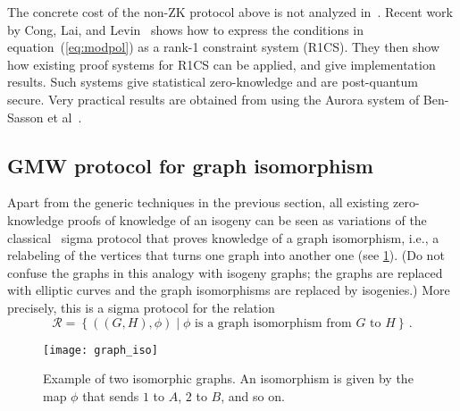 \documentclass{llncs}
\newcommand{\Rela}{\mathcal{R}}
\begin{document}
The concrete cost of the non-ZK protocol above is not analyzed in~\cite{10.1007/978-3-030-99277-4_21}.
Recent work by Cong, Lai, and Levin~\cite{CLL23} shows how to express the conditions in equation~(\ref{eq:modpol}) as a rank-1 constraint system (R1CS). They then show how existing proof systems for R1CS can be applied, and give implementation results. Such systems give statistical zero-knowledge and are post-quantum secure.
Very practical results are obtained from using the Aurora system of Ben-Sasson et al~\cite{Aurora}.



\subsection{GMW protocol for graph isomorphism \label{sec:GMW}}

Apart from the generic techniques in the previous section, all existing zero-knowledge proofs of knowledge of an isogeny can be seen as variations of the classical~\cite{GMW} sigma protocol that proves knowledge of a graph isomorphism, i.e., a relabeling of the vertices that turns one graph into another one (see \cref{fig:graph_iso}). 
(Do not confuse the graphs in this analogy with isogeny graphs; the graphs are replaced with elliptic curves and the graph isomorphisms are replaced by isogenies.)
More precisely, this is a sigma protocol for the relation \[
\Rela = \left \{ ((G,H),\phi) \mid \phi \text{ is a graph isomorphism from $G$ to $H$} \right \} \,.
\]




\begin{figure} \label{fig:graph_iso}
\centering
\texttt{[image: graph\_iso]}
\caption[Example of a graph isomorphism]{Example of two isomorphic graphs. An isomorphism is given by the map $\phi$ that sends $1$ to $A$, $2$ to $B$, and so on. } 
\end{figure}
\end{document}
